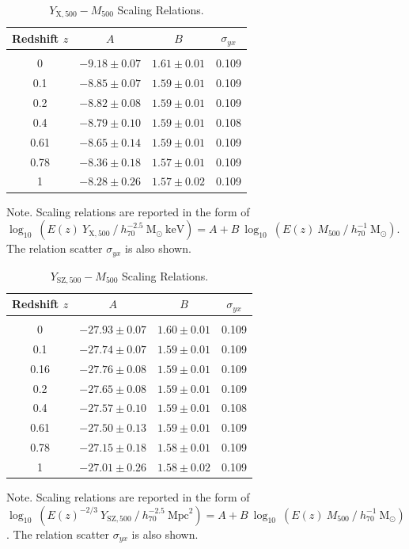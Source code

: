 \documentclass[traditabstract]{aa}
\newcommand{\rmn}{\mathrm}
\begin{document}
\begin{table}[t]
\begin{center}
\caption{$Y_{\rmn{X}, 500}-M_{500}$ Scaling Relations.}
\medskip
\begin{tabular}{cccc}
\hline
\phantom{\Big|}
Redshift $z$ & $A$ & $B$ & $\sigma_{yx}$ \\
\hline\\[-0.5em]
 0      & $-9.18\pm0.07$ & $1.61\pm0.01$ & 0.109\\
 0.1   & $-8.85\pm0.07$ & $1.59\pm0.01$ & 0.109\\
 0.2   & $-8.82\pm0.08$ & $1.59\pm0.01$ & 0.109\\ 
 0.4   & $-8.79\pm0.10$ & $1.59\pm0.01$ & 0.108\\ 
 0.61 & $-8.65\pm0.14$ & $1.59\pm0.01$ & 0.109\\ 
 0.78 & $-8.36\pm0.18$ & $1.57\pm0.01$ & 0.109\\ 
 1      & $-8.28\pm0.26$ & $1.57\pm0.02$ & 0.109\\[0.5em]  
\hline
\end{tabular}
\label{tab:YXfits}
\end{center}
\footnotesize{Note. Scaling relations are reported in the form of $\log_{10}~(E(z)~Y_{\rmn{X},500}~/~h_{70}^{-2.5}~\rmn{M_{\odot}}~\rmn{keV})=A+B~\log_{10}~(E(z)~M_{500}~/~h_{70}^{-1}~\rmn{M_{\odot}})$. The relation scatter $\sigma_{yx}$ is also shown.}
\end{table}

\begin{table}[t]
\begin{center}
\caption{$Y_{\rmn{SZ}, 500}-M_{500}$ Scaling Relations.}
\medskip
\begin{tabular}{cccc}
\hline
\phantom{\Big|}
Redshift $z$ & $A$ & $B$ & $\sigma_{yx}$ \\
\hline\\[-0.5em]
 0      & $-27.93\pm0.07$ & $1.60\pm0.01$ & 0.109\\
 0.1   & $-27.74\pm0.07$ & $1.59\pm0.01$ & 0.109\\
 0.16 & $-27.76\pm0.08$ & $1.59\pm0.01$ & 0.109\\
 0.2   & $-27.65\pm0.08$ & $1.59\pm0.01$ & 0.109\\ 
 0.4   & $-27.57\pm0.10$ & $1.59\pm0.01$ & 0.108\\ 
 0.61 & $-27.50\pm0.13$ & $1.59\pm0.01$ & 0.109\\ 
 0.78 & $-27.15\pm0.18$ & $1.58\pm0.01$ & 0.109\\ 
 1      & $-27.01\pm0.26$ & $1.58\pm0.02$ & 0.109\\[0.5em] 
\hline
\end{tabular}
\label{tab:YSZfits}
\end{center}
\footnotesize{Note. Scaling relations are reported in the form of $\log_{10}~(E(z)^{-2/3}~Y_{\rmn{SZ},500}~/~h_{70}^{-2.5}~\rmn{Mpc}^{2})=A+B~\log_{10}~(E(z)~M_{500}~/~h_{70}^{-1}~\rmn{M_{\odot}})$. The relation scatter $\sigma_{yx}$ is also shown.}
\end{table}
\end{document}
